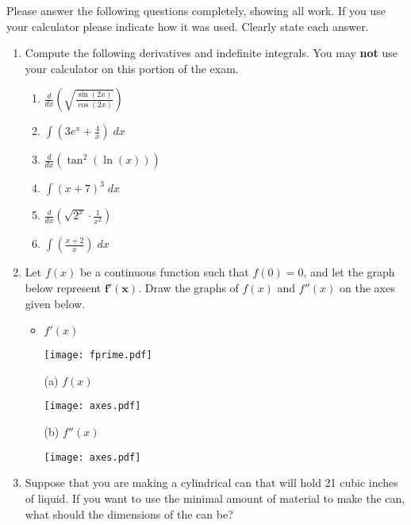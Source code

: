 \documentclass[11pt]{article}
\newcommand{\ds}{\displaystyle}
\begin{document}
\drawtitle

\noindent Please answer the following questions completely, showing all work.
If you use your calculator please indicate how it was used.  Clearly
state each answer.

\begin{enumerate}
\item Compute the following derivatives and indefinite integrals.  You
  may \textbf{not} use your calculator on this portion of the exam.
  \begin{enumerate}
  \item $\ds\frac{d}{dx}\left(\sqrt{\frac{\sin(2x)}{\cos(2x)}}\right)$
    \vfill
  \item $\ds\int\left(3e^x+\frac{4}{x}\right)\;dx$
    \vfill
    \newpage
  \item $\ds\frac{d}{dx}\left(\tan^2\left(\ln\left(
          x\right)\right)\right)$ \vfill
  \item $\ds\int\left(x+7\right)^3\;dx$
    \vfill
    \newpage
  \item $\ds\frac{d}{dx}\left(\sqrt{2^x}\cdot \frac{1}{x^2}\right)$
    \vfill
  \item $\ds\int\left(\frac{x+2}{x}\right)\;dx$
    \vfill
  \end{enumerate}

  \newpage
  
\item Let $f(x)$ be a continuous function such that $f(0)=0$, and let
  the graph below represent $\mathbf{f'(x)}$.  Draw the graphs of
  $f(x)$ and $f''(x)$ on the axes given below.
  \begin{itemize}
  \item $f'(x)$
    \begin{center}
      \texttt{[image: fprime.pdf]}
    \end{center}
    \vfill
  \item[(a)] $f(x)$
    \begin{center}
      \texttt{[image: axes.pdf]}
    \end{center}
    \vfill
  \item[(b)] $f''(x)$
    \begin{center}
      \texttt{[image: axes.pdf]}
    \end{center}
    \vfill
  \end{itemize}

  \newpage

\item Suppose that you are making a cylindrical can that will hold 21
  cubic inches of liquid.  If you want to use the minimal amount of
  material to make the can, what should the dimensions of the can be?
  \vfill \newpage


\end{enumerate}
\end{document}
